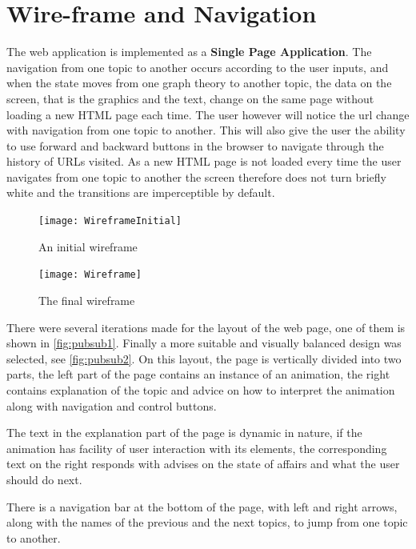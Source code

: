\section{Wire-frame and Navigation}
The web application is implemented as a \textbf{Single Page Application}. The navigation
from one topic to another occurs according to the user inputs, and when the state
moves from one graph theory to another topic, the data on the screen, that is
the graphics and the text, change on the same page without loading a new HTML page
each time. The user however will notice the url change with navigation from one
topic to another. This will also give the user the ability to use forward and
backward buttons in the browser to navigate through the history of URLs
visited. As a new HTML page is not loaded every time the user navigates from
one topic to another the screen therefore does not turn briefly white and the
transitions are imperceptible by default.

\begin{figure}[H]
    \centering
    \begin{minipage}{.5\textwidth}
        \centering
        \texttt{[image: WireframeInitial]}
        \caption{An initial wireframe}
        \label{fig:pubsub1}
    \end{minipage}%
    \begin{minipage}{.5\textwidth}
        \centering
        \texttt{[image: Wireframe]}
        \caption{The final wireframe}
        \label{fig:pubsub2}
    \end{minipage}
\end{figure}

There were several iterations made for the layout of the web page, one of them
is shown in \autoref{fig:pubsub1}. Finally a more suitable and visually balanced design was selected, see
\autoref{fig:pubsub2}. On this layout, the page is vertically divided into two
parts, the left part of the page contains an instance of an animation, the
right contains explanation of the topic and advice on how to interpret the
animation along with navigation and control buttons. 

The text in the explanation part of the page is dynamic in nature, if the
animation has facility of user interaction with its elements, the
corresponding text on the right responds with advises on the state of affairs
and what the user should do next.

There is a navigation bar at the bottom of the page, with left and right
arrows, along with the names of the previous and the next topics, to jump from
one topic to another.

